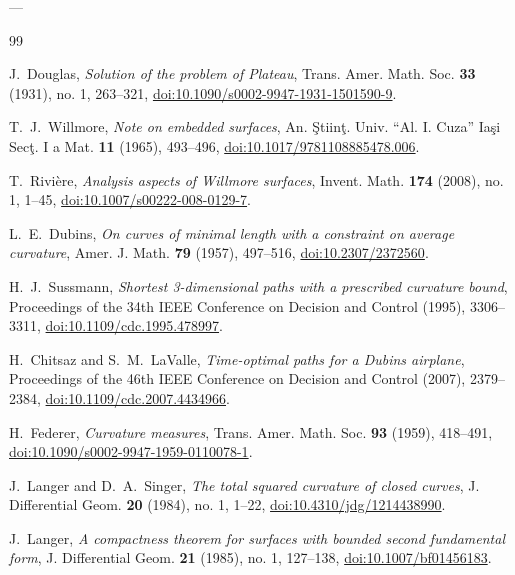 \documentclass[11pt,reqno]{amsart}
\theoremstyle{definition}
\numberwithin{equation}{section}
\begin{document}
---

\begin{thebibliography}{99}

J.~Douglas,
\emph{Solution of the problem of Plateau},
Trans. Amer. Math. Soc. \textbf{33} (1931), no. 1, 263--321, \href{https://doi.org/10.1090/s0002-9947-1931-1501590-9}{doi:10.1090/s0002-9947-1931-1501590-9}.

T.~J.~Willmore,
\emph{Note on embedded surfaces},
An. \c{S}tiin\c{t}. Univ. ``Al. I. Cuza'' Ia\c{s}i Sec\c{t}. I a Mat. \textbf{11} (1965), 493--496, \href{https://doi.org/10.1017/9781108885478.006}{doi:10.1017/9781108885478.006}.

T.~Rivi\`ere,
\emph{Analysis aspects of Willmore surfaces},
Invent. Math. \textbf{174} (2008), no. 1, 1--45, \href{https://doi.org/10.1007/s00222-008-0129-7}{doi:10.1007/s00222-008-0129-7}.

L.~E.~Dubins,
\emph{On curves of minimal length with a constraint on average curvature},
Amer. J. Math. \textbf{79} (1957), 497--516, \href{https://doi.org/10.2307/2372560}{doi:10.2307/2372560}.

H.~J.~Sussmann,
\emph{Shortest 3-dimensional paths with a prescribed curvature bound},
Proceedings of the 34th IEEE Conference on Decision and Control (1995), 3306--3311, \href{https://doi.org/10.1109/cdc.1995.478997}{doi:10.1109/cdc.1995.478997}.

H.~Chitsaz and S.~M.~LaValle,
\emph{Time-optimal paths for a Dubins airplane},
Proceedings of the 46th IEEE Conference on Decision and Control (2007), 2379--2384, \href{https://doi.org/10.1109/cdc.2007.4434966}{doi:10.1109/cdc.2007.4434966}.

H.~Federer,
\emph{Curvature measures},
Trans. Amer. Math. Soc. \textbf{93} (1959), 418--491, \href{https://doi.org/10.1090/s0002-9947-1959-0110078-1}{doi:10.1090/s0002-9947-1959-0110078-1}.

J.~Langer and D.~A.~Singer,
\emph{The total squared curvature of closed curves},
J. Differential Geom. \textbf{20} (1984), no. 1, 1--22, \href{https://doi.org/10.4310/jdg/1214438990}{doi:10.4310/jdg/1214438990}.

J.~Langer,
\emph{A compactness theorem for surfaces with bounded second fundamental form},
J. Differential Geom. \textbf{21} (1985), no. 1, 127--138, \href{https://doi.org/10.1007/bf01456183}{doi:10.1007/bf01456183}.


\end{thebibliography}
\end{document}
